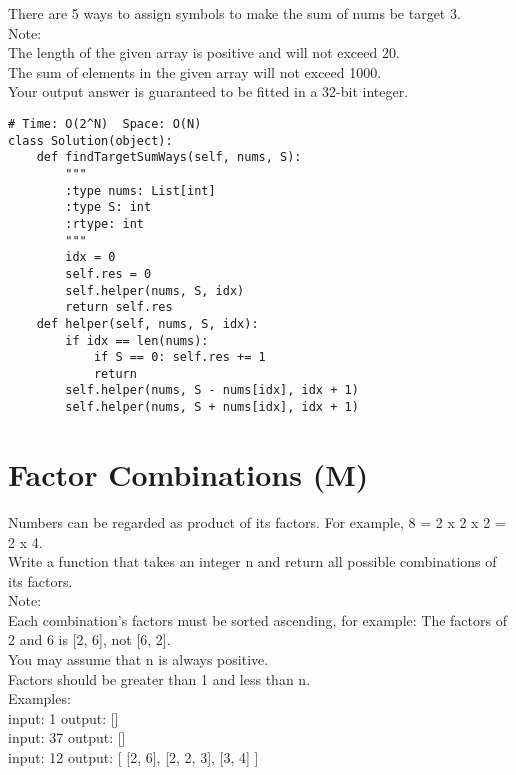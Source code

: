 There are 5 ways to assign symbols to make the sum of nums be target 3.\\

Note:\\

    The length of the given array is positive and will not exceed 20.\\
    The sum of elements in the given array will not exceed 1000.\\
    Your output answer is guaranteed to be fitted in a 32-bit integer.\\

\begin{lstlisting}
# Time: O(2^N)  Space: O(N)
class Solution(object):
    def findTargetSumWays(self, nums, S):
        """
        :type nums: List[int]
        :type S: int
        :rtype: int
        """
        idx = 0
        self.res = 0
        self.helper(nums, S, idx)
        return self.res
    def helper(self, nums, S, idx):
        if idx == len(nums):
            if S == 0: self.res += 1
            return
        self.helper(nums, S - nums[idx], idx + 1)
        self.helper(nums, S + nums[idx], idx + 1)
\end{lstlisting}
     
\section{Factor Combinations (M)}
Numbers can be regarded as product of its factors. For example, 8 = 2 x 2 x 2 = 2 x 4.\\

Write a function that takes an integer n and return all possible combinations of its factors.\\

Note: \\
    Each combination's factors must be sorted ascending, for example: The factors of 2 and 6 is [2, 6], not [6, 2].\\
    You may assume that n is always positive.\\
    Factors should be greater than 1 and less than n.\\

Examples: \\
input: 1
output: 
[]\\

input: 37
output: 
[]\\

input: 12
output:
[
  [2, 6],
  [2, 2, 3],
  [3, 4]
]\\

